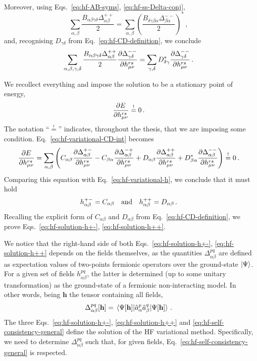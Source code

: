 \begin{tabproof}
\[\begin{aligned}
	\end{aligned}
	\]
	Moreover, using Eqs.~\eqref{eq:hf-AB-syms}, \eqref{eq:hf-ss-Delta-conj},
	\[
		\sum_{\alpha,\beta} \frac{B_{\alpha\beta\gamma\delta} \Delta_{\alpha\beta}^{++}}{2}
		= \sum_{\alpha,\beta} \left(
			\frac{B_{\delta\gamma\beta\alpha} \Delta_{\beta\alpha}^{--}}{2}
		\right)^* \, ,
	\]
	and, recognising $D_{\gamma\delta}$ from Eq.~\eqref{eq:hf-CD-definition}, we conclude
	\[
		\sum_{\alpha,\beta,\gamma,\delta} \frac{B_{\alpha\beta\gamma\delta} \Delta_{\alpha\beta}^{++}}{2} \pdv{\Delta_{\gamma\delta}^{--}}{h_{\mu\nu}^{rs}}
		= \sum_{\gamma,\delta}
		D_{\delta\gamma}^*
		\pdv{\Delta_{\gamma\delta}^{--}}{h_{\mu\nu}^{rs}} \, .
	\]
	
	We recollect everything and impose the solution to be a stationary point of energy,
	\[
		\pdv{E}{h_{\mu\nu}^{rs}} \stackrel{!}{=} 0 \, .
	\]
	The notation ``$\stackrel{!}{=}$'' indicates, throughout the thesis, that we are imposing some condition. Eq.~\eqref{eq:hf-variational-CD-int} becomes
	\begin{equation}\label{eq:hf-variational-CD}
		\pdv{E}{h_{\mu\nu}^{rs}} = \sum_{\alpha,\beta} \left( 
			C_{\alpha\beta} \pdv{\Delta_{\alpha\beta}^{+-}}{h_{\mu\nu}^{rs}} - C_{\beta\alpha} \pdv{\Delta_{\alpha\beta}^{-+}}{h_{\mu\nu}^{rs}} + D_{\alpha\beta} \pdv{\Delta_{\alpha\beta}^{++}}{h_{\mu\nu}^{rs}} + D_{\beta\alpha}^* 	\pdv{\Delta_{\alpha\beta}^{--}}{h_{\mu\nu}^{rs}}
		\right) \stackrel{!}{=} 0 \, .
	\end{equation}
	Comparing this equation with Eq.~\eqref{eq:hf-variational-h}, we conclude that it must hold
	\[
		h_{\alpha\beta}^{+-} = C_{\alpha\beta}
		\qq{and}
		h_{\alpha\beta}^{++} = D_{\alpha\beta} \, .
	\]
	Recalling the explicit form of $C_{\alpha\beta}$ and $D_{\alpha\beta}$ from  Eq.~\eqref{eq:hf-CD-definition}, we prove Eqs.~\eqref{eq:hf-solution-h+-}, \eqref{eq:hf-solution-h++}.
\end{tabproof}

We notice that the right-hand side of both Eqs.~\eqref{eq:hf-solution-h+-}, \eqref{eq:hf-solution-h++} depends on the fields themselves, as the quantities $\Delta_{\alpha\beta}^{pq}$ are defined as expectation values of two-points fermionic operators over the ground-state $\ket{\Psi}$. For a given set of fields $h_{\alpha\beta}^{pq}$, the latter is determined (up to some unitary transformation) as the ground-state of a fermionic non-interacting model. In other words, being $\mathbf{h}$ the tensor containing all fields,
\begin{equation}\label{eq:hf-self-consistency-general}
	\Delta_{\alpha\beta}^{pq}[\mathbf{h}] = \mel{\Psi[\mathbf{h}]}{\hat a_\alpha^p \hat a_\beta^q}{\Psi[\mathbf{h}]} \, .
\end{equation}
The three Eqs.~\eqref{eq:hf-solution-h+-}, \eqref{eq:hf-solution-h++} and \eqref{eq:hf-self-consistency-general} define the solution of the HF variational method. Specifically, we need to determine $\Delta_{\alpha\beta}^{pq}$ such that, for given fields, Eq.~\eqref{eq:hf-self-consistency-general} is respected.

